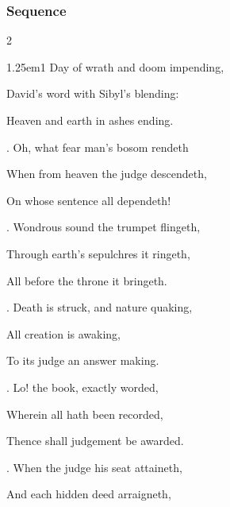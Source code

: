 
\subsubsection{Sequence}\label{diesirae}
\begin{multicols}{2}
\begin{hangparas}{1.25em}{1}
Day of wrath and doom impending,\par
David's word with Sibyl's blending:\par
Heaven and earth in ashes ending.\\%
\par{}. Oh, what fear man's bosom rendeth\par\noindent
When from heaven the judge descendeth,\par\noindent
On whose sentence all dependeth!\\
\par{}. Wondrous sound the trumpet flingeth,\par\noindent
Through earth's sepulchres it ringeth,\par\noindent
All before the throne it bringeth.\\
\par{}. Death is struck, and nature quaking,\par\noindent
All creation is awaking,\par\noindent
To its judge an answer making.\\
\par{}. Lo! the book, exactly worded,\par\noindent
Wherein all hath been recorded,\par\noindent
Thence shall judgement be awarded.\\
\par{}. When the judge his seat attaineth,\par\noindent
And each hidden deed arraigneth,\par\noindent

\end{hangparas}
\end{multicols}
